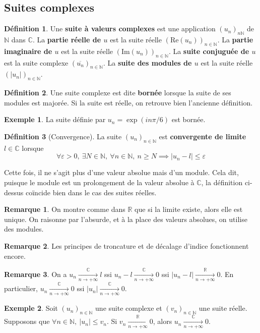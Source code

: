 \documentclass[french]{book}
\newcommand{\N}{\mathbb{N}}
\newcommand{\R}{\mathbb{R}}
\newcommand{\C}{\mathbb{C}}
\theoremstyle{plain}
\theoremstyle{definition}
\newtheorem{dfn}{Définition}[chapter]
\newtheorem{exa}{Exemple}[chapter]
\newtheorem{rmq}{Remarque}[chapter]
\theoremstyle{remark}
\begin{document}
\subsection{Suites complexes}
\begin{dfn}
	Une \textbf{suite à valeurs complexes} est une application $(u_n)_{n\N}$ de $\N$ dans $\C$. La \textbf{partie réelle de $u$} est la suite réelle $(\text{Re}(u_n))_{n\in\N}$. La \textbf{partie imaginaire de $u$} est la suite réelle $(\text{Im}(u_n))_{n\in\N}$. La \textbf{suite conjuguée de $u$} est la suite complexe $(\overline{u_n})_{n\in\N}$. La \textbf{suite des modules de $u$} est la suite réelle $(\lvert u_n\rvert)_{n\in\N}$. 
\end{dfn}
\begin{dfn}
	Une suite complexe est dite \textbf{bornée} lorsque la suite de ses modules est majorée. Si la suite est réelle, on retrouve bien l'ancienne définition.
\end{dfn}
\begin{exa}
	La suite définie par $u_n=\exp(in\pi/6)$ est bornée.
\end{exa}
\begin{dfn}[Convergence]
	La suite $(u_n)_{n\in\N}$ est \textbf{convergente de limite $l\in\C$} lorsque $$\forall\varepsilon>0,\ \exists N\in\N,\ \forall n\in\N,\ n\geqslant N\implies \lvert u_n-l\rvert\leqslant\varepsilon$$
\end{dfn}
Cette fois, il ne s'agit plus d'une valeur absolue mais d'un module. Cela dit, puisque le module est un prolongement de la valeur absolue à $\C$, la définition ci-dessus coïncide bien dans le cas des suites réelles.
\begin{rmq}
	On montre comme dans $\R$ que si la limite existe, alors elle est unique. On raisonne par l'absurde, et à la place des valeurs absolues, on utilise des modules.
\end{rmq}
\begin{rmq}
	Les principes de troncature et de décalage d'indice fonctionnent encore.
\end{rmq}
\begin{rmq}
	On a $u_n\xrightarrow[n\to+\infty]{\C} l$ ssi $u_n-l\xrightarrow[n\to+\infty]{\C} 0$ ssi $\lvert u_n-l\rvert\xrightarrow[n\to+\infty]{\R} 0$. En particulier, $u_n\xrightarrow[n\to+\infty]{\C} 0$ ssi $\lvert u_n\rvert\xrightarrow[n\to+\infty]{\C} 0$.
\end{rmq}
\begin{exa}
	Soit $(u_n)_{n\in\N}$ une suite complexe et $(v_n)_{n\in\N}$ une suite réelle. Supposons que $\forall n\in\N,\ \lvert u_n\rvert\leqslant v_n$. Si $v_n\xrightarrow[n\to+\infty]{\R}0$, alors $u_n\xrightarrow[n\to+\infty]{\C}0$.
\end{exa}
\end{document}
